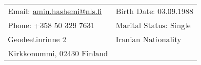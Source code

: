 \documentclass[10pt,a4paper]{article} %
\begin{document}
 



{\footnotesize
\begin{tabular}{l l}
Email: \href{mailto:amin.hashemi@nls.fi}{amin.hashemi@nls.fi}				&	Birth Date: 03.09.1988\\
Phone: {+358} 50 329 7631								&	Marital Status: Single\\
Geodeetinrinne 2									& 	Iranian Nationality\\
Kirkkonummi, 02430 Finland								&	\\
\end{tabular}
}
\spacedhrule{0.9em}{-0.4em} %


% 
% 
% 
% 
\end{document}

